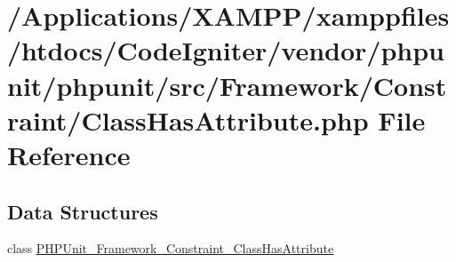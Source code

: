 \hypertarget{_class_has_attribute_8php}{}\section{/\+Applications/\+X\+A\+M\+P\+P/xamppfiles/htdocs/\+Code\+Igniter/vendor/phpunit/phpunit/src/\+Framework/\+Constraint/\+Class\+Has\+Attribute.php File Reference}
\label{_class_has_attribute_8php}
\subsection*{Data Structures}
\begin{DoxyCompactItemize}
\item 
class \mbox{\hyperlink{class_p_h_p_unit___framework___constraint___class_has_attribute}{P\+H\+P\+Unit\+\_\+\+Framework\+\_\+\+Constraint\+\_\+\+Class\+Has\+Attribute}}
\end{DoxyCompactItemize}
